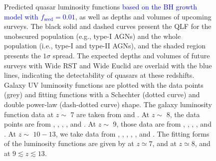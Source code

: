 \documentclass[twocolumn, twocolappendix]{aastex63}
\newcommand{\fseed}{f_\mathrm{seed}}
\newcommand{\blue}[1]{\textcolor{blue}{ #1}}
\begin{document}
\begin{CJK*}{UTF8}{gbsn}
\begin{figure}[h!]
\caption{Predicted quasar luminosity functions \blue{based on the BH growth model with $\fseed=0.01$},
as well as depths and volumes of upcoming surveys.
The black solid and dashed curves present the QLF for the unobscured population (e.g., type-I AGNs) 
and the whole population (i.e., type-I and type-II AGNs), and the shaded region presents the $1\sigma$ spread.
The expected depths and volumes of future surveys with Wide RST and Wide Euclid are overlaid with the blue lines,
indicating the detectability of quasars at these redshifts.
Galaxy UV luminosity functions are plotted with the data points (grey) and fitting functions with a Schechter (dotted curve) and double power-law (dash-dotted curve) shape.
The galaxy luminosity function data at $z\sim$ 7 are taken from \citet{2022ApJS..259...20H} and \citet{2021AJ....162...47B}. 
At $z\sim$ 8, the data points are from \citet{2021AJ....162...47B},
\citet{2022arXiv220712356D}, \citet{2013MNRAS.432.2696M}, \citet{2020MNRAS.493.2059B}, and \citet{2019ApJ...883...99S}.
At  $z\sim$ 9, those data are from \citet{Harikane_2022c}, \citet{2022arXiv220712356D}, \citet{2020MNRAS.493.2059B}, \citet{2019ApJ...883...99S}, 
and \citet{2018ApJ...867..150M}.
At $z\sim$ $10-13$, we take data from \citet{Harikane_2022c}, \citet{2022arXiv220712356D}, \citet{Harikane_2022b}, \citet{2022arXiv220709434N}, \citet{2018ApJ...867..150M}, 
and \citet{2016ApJ...819..129O}.
The fitting forms of the luminosity functions are given by \citet{2022ApJS..259...20H} at $z\simeq 7$, 
\citet{2020MNRAS.493.2059B} and \citet{2013MNRAS.432.2696M} at $z\simeq 8$, and \citet{Harikane_2022c} at $9\lesssim z\lesssim 13$.
}
\label{fig:LFs}
\end{figure}



\end{CJK*}
\end{document}

